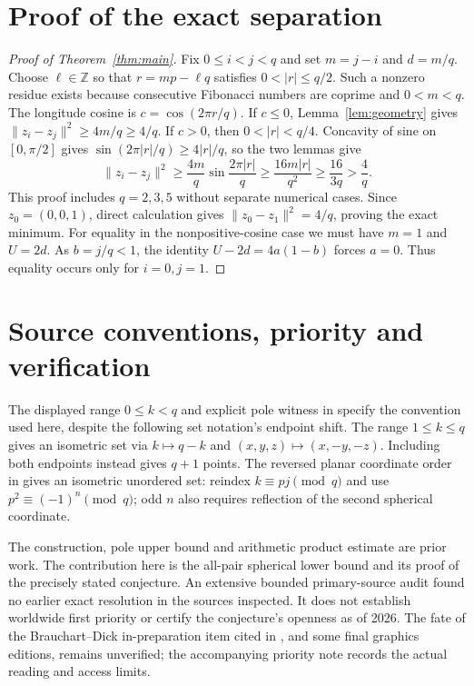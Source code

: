 \documentclass[11pt]{article}
\newcommand{\Z}{\mathbb Z}
\begin{document}
\section{Proof of the exact separation}
\begin{proof}[Proof of Theorem~\ref{thm:main}]
Fix $0\leq i<j<q$ and set $m=j-i$ and $d=m/q$.
Choose $\ell\in\Z$ so that $r=mp-\ell q$ satisfies
$0<|r|\leq q/2$. Such a nonzero residue exists because consecutive
Fibonacci numbers are coprime and $0<m<q$.
The longitude cosine is $c=\cos(2\pi r/q)$.
If $c\leq0$, Lemma~\ref{lem:geometry} gives
$\|z_i-z_j\|^2\geq4m/q\geq4/q$.
If $c>0$, then $0<|r|<q/4$. Concavity of sine on $[0,\pi/2]$ gives
$\sin(2\pi|r|/q)\geq4|r|/q$, so the two lemmas give
\[
 \|z_i-z_j\|^2\geq\frac{4m}{q}\sin\frac{2\pi|r|}{q}
 \geq\frac{16m|r|}{q^2}\geq\frac{16}{3q}>\frac4q.
\]
This proof includes $q=2,3,5$ without separate numerical cases.
Since $z_0=(0,0,1)$, direct calculation gives
$\|z_0-z_1\|^2=4/q$, proving the exact minimum.
For equality in the nonpositive-cosine case we must have $m=1$ and
$U=2d$. As $b=j/q<1$, the identity $U-2d=4a(1-b)$ forces $a=0$.
Thus equality occurs only for $i=0,j=1$.
\end{proof}

\section{Source conventions, priority and verification}
The displayed range $0\leq k<q$ and explicit pole witness in
\cite[p.~2438]{Brauchart} specify the convention used here, despite
the following set notation's endpoint shift. The range $1\leq k\leq q$
gives an isometric set via $k\mapsto q-k$ and
$(x,y,z)\mapsto(x,-y,-z)$. Including both endpoints instead gives $q+1$
points. The reversed planar coordinate order in
\cite[Section~5.2]{ABD} gives an isometric unordered set: reindex
$k\equiv pj\pmod q$ and use $p^2\equiv(-1)^n\pmod q$; odd $n$ also
requires reflection of the second spherical coordinate.

The construction, pole upper bound and arithmetic product estimate are
prior work. The contribution here is the all-pair spherical lower bound
and its proof of the precisely stated conjecture. An extensive bounded
primary-source audit found no earlier exact resolution in the sources
inspected. It does not establish worldwide first priority or certify
the conjecture's openness as of 2026. The fate of the Brauchart--Dick
in-preparation item cited in \cite{Brauchart}, and some final graphics
editions, remains unverified; the accompanying priority note records
the actual reading and access limits.
\end{document}
